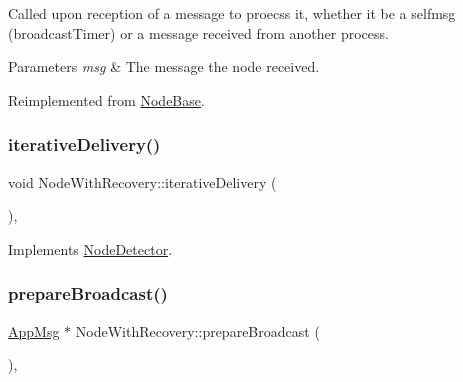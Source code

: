 Called upon reception of a message to proecss it, whether it be a selfmsg (broadcast\+Timer) or a message received from another process. 


\begin{DoxyParams}{Parameters}
{\em msg} & The message the node received. \\
\hline
\end{DoxyParams}


Reimplemented from \hyperlink{class_node_base_add2450264be5dd616f9f9ac94e83b988}{Node\+Base}.

\mbox{\label{class_node_with_recovery_a9b61912f38b62452584dc80bf261ef4e}} 
\subsubsection{\texorpdfstring{iterative\+Delivery()}{iterativeDelivery()}}
{\footnotesize\ttfamily void Node\+With\+Recovery\+::iterative\+Delivery (\begin{DoxyParamCaption}{ }\end{DoxyParamCaption})\hspace{0.3cm}{\ttfamily [protected]}, {\ttfamily [virtual]}}



Implements \hyperlink{class_node_detector_a17ecf9939fce7471f4513b66185743cc}{Node\+Detector}.

\mbox{\label{class_node_with_recovery_a33d8e8775fd69cb647b38a54b36e1ebe}} 
\subsubsection{\texorpdfstring{prepare\+Broadcast()}{prepareBroadcast()}}
{\footnotesize\ttfamily \hyperlink{class_app_msg}{App\+Msg} $\ast$ Node\+With\+Recovery\+::prepare\+Broadcast (\begin{DoxyParamCaption}{ }\end{DoxyParamCaption})\hspace{0.3cm}{\ttfamily [protected]}, {\ttfamily [virtual]}}



